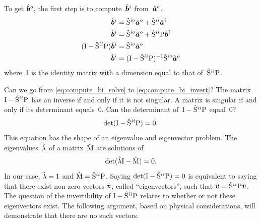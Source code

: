 To get $\hat{\bm{b}}^o$, the first step is to compute~$\hat{\bm{b}}^i$ from~$\hat{\bm{a}}^o$.
\begin{subequations}
    \label{eq:compute_bi}
    \begin{align}
        \hat{\bm{b}}^i
        &=
        \hat{\mathrm{S}}^{io} \hat{\bm{a}}^o + \hat{\mathrm{S}}^{ii}\hat{\bm{a}}^i
        \label{eq:compute_bi_ai}
        \\
        \hat{\bm{b}}^i
        &=
        \hat{\mathrm{S}}^{io} \hat{\bm{a}}^o + \hat{\mathrm{S}}^{ii} \mathrm{P} \hat{\bm{b}}^i
        \label{eq:compute_bi_bi}
        \\
        (\mathrm{I} - \hat{\mathrm{S}}^{ii}\mathrm{P}) \hat{\bm{b}}^i
        &=
        \hat{\mathrm{S}}^{io} \hat{\bm{a}}^o
        \label{eq:compute_bi_solve}
        \\
        \hat{\bm{b}}^i
        &=
        (\mathrm{I} - \hat{\mathrm{S}}^{ii} \mathrm{P})^{-1} \hat{\mathrm{S}}^{io} \hat{\bm{a}}^o
        \label{eq:compute_bi_invert}
    \end{align}
\end{subequations}
where~$\mathrm{I}$ is the identity matrix with a dimension equal to that of~$\hat{\mathrm{S}}^{ii}\mathrm{P}$.

Can we go from \cref{eq:compute_bi_solve} to \cref{eq:compute_bi_invert}?
The matrix~$\mathrm{I} - \hat{\mathrm{S}}^{ii}\mathrm{P}$ has an inverse if and only if it is not singular.
A matrix is singular if and only if its determinant equals~0.
Can the determinant of~$\mathrm{I} - \hat{\mathrm{S}}^{ii}\mathrm{P}$ equal~0?
\begin{equation}
    \det(\mathrm{I} - \hat{\mathrm{S}}^{ii}\mathrm{P}) = 0
    \text{.}
    \label{eq:det_i_minus_siip}
\end{equation}
This equation has the shape of an eigenvalue and eigenvector problem.
The eigenvalues~$\hat{\lambda}$ of a matrix~$\hat{\mathrm{M}}$ are solutions of
\begin{equation}
    \det(\hat{\lambda} \mathrm{I} - \hat{\mathrm{M}}) = 0 \label{eq:eigenvalue_typical}
    \text{.}
\end{equation}
In our case, $\hat{\lambda}=1$ and $\hat{\mathrm{M}}=\hat{\mathrm{S}}^{ii}\mathrm{P}$.
Saying $\det(\mathrm{I} - \hat{\mathrm{S}}^{ii}\mathrm{P}) = 0$ is equivalent to saying that there exist non-zero vectors $\hat{\bm{v}}$, called ``eigenvectors'',
such that $\hat{\bm{v}} = \hat{\mathrm{S}}^{ii}\mathrm{P}\hat{\bm{v}}$.
The question of the invertibility of $\mathrm{I} - \hat{\mathrm{S}}^{ii}\mathrm{P}$ relates to whether or not these eigenvectors exist.
The following argument, based on physical considerations, will demonstrate that there are no such vectors.

